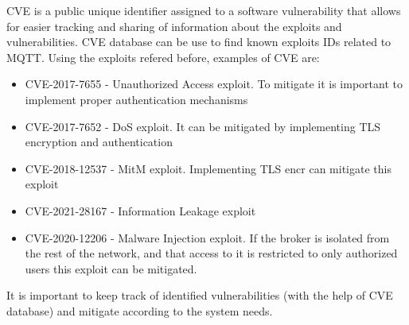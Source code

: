 \ac{CVE} is a public unique identifier assigned to a software vulnerability that allows for easier tracking and sharing of information about the exploits and vulnerabilities.
\ac{CVE} database can be use to find known exploits IDs related to \acs{MQTT}. Using the exploits refered before, examples of CVE are:
\begin{itemize}
    \item CVE-2017-7655 - Unauthorized Access exploit. To mitigate it is important to implement proper authentication mechanisms
    \item CVE-2017-7652 - \ac{DoS} exploit. It can be mitigated by implementing TLS encryption and authentication
    \item CVE-2018-12537 - \ac{MitM} exploit. Implementing TLS encr can mitigate this exploit
    \item CVE-2021-28167 - Information Leakage exploit
    \item CVE-2020-12206 - Malware Injection exploit. If the broker is isolated from the rest of the network, and that access to it is restricted to only authorized users this exploit can be mitigated.
\end{itemize}

It is important to keep track of identified vulnerabilities (with the help of CVE database) and mitigate according to the system needs.

\clearpage